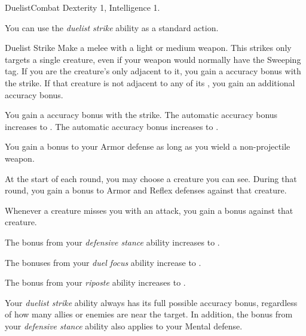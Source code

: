     \begin{feat}{Duelist}{Combat}
        \featpre Dexterity 1, Intelligence 1.

         You can use the \textit{duelist strike} ability as a standard action.
        \begin{freeability}{Duelist Strike}
            Make a melee  with a light or medium weapon.
            This strikes only targets a single creature, even if your weapon would normally have the Sweeping tag.
            If you are the creature's only  adjacent to it, you gain a  accuracy bonus with the strike.
            If that creature is not adjacent to any of its , you gain an additional  accuracy bonus.

            \rankline
             You gain a  accuracy bonus with the strike.
             The automatic accuracy bonus increases to .
             The automatic accuracy bonus increases to .
        \end{freeability}

         You gain a  bonus to your Armor defense as long as you wield a non-projectile weapon.

         At the start of each round, you may choose a creature you can see.
        During that round, you gain a  bonus to Armor and Reflex defenses against that creature.

         Whenever a creature misses you with an attack, you  gain a   bonus against that creature.

         The bonus from your \textit{defensive stance} ability increases to .

         The bonuses from your \textit{duel focus} ability increase to .

         The bonus from your \textit{riposte} ability increases to .

         Your \textit{duelist strike} ability always has its full possible accuracy bonus, regardless of how many allies or enemies are near the target.
        In addition, the bonus from your \textit{defensive stance} ability also applies to your Mental defense.
    \end{feat}

